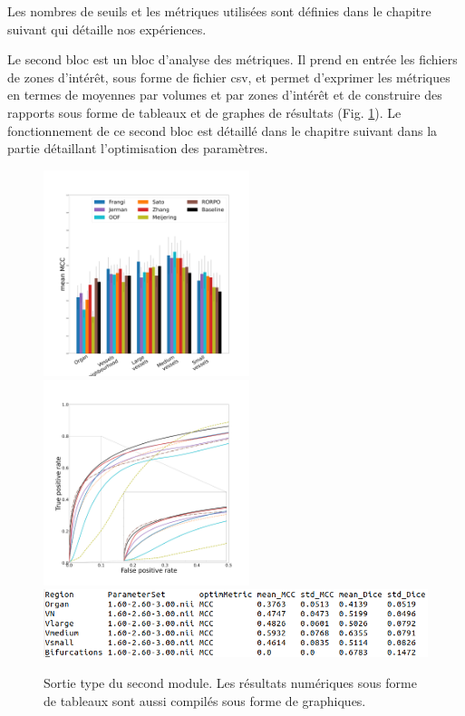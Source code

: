 Les nombres de seuils et les métriques utilisées sont définies dans le chapitre suivant qui détaille nos expériences. 

Le second bloc est un bloc d'analyse des métriques. Il prend en entrée les fichiers de zones d'intérêt, sous forme de fichier csv, et permet d'exprimer les métriques en termes de moyennes par volumes et par zones d'intérêt et de construire des rapports sous forme de tableaux et de graphes de résultats (Fig. \ref{fig:bench_module2}). Le fonctionnement de ce second bloc est détaillé dans le chapitre suivant dans la partie détaillant l'optimisation des paramètres. 

\begin{figure}[!ht]
  \centering
  \includegraphics[height=6cm]{Images/bench_Ircad_PS_MCC.pdf}
  \includegraphics[height=6cm]{Images/bench_Ircad_ROC.pdf}
  \includegraphics[width=\textwidth]{Images/bench_type_of_results.png}
  \caption{Sortie type du second module. Les résultats numériques sous forme de tableaux sont aussi compilés sous forme de graphiques.}
  \label{fig:bench_module2}
\end{figure}

